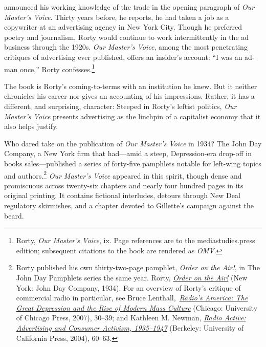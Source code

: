 \documentclass[nohyper,openany,nobib]{tufte-book}
\begin{document}
\vspace{0.5in}

 announced his working knowledge of the trade in the opening
paragraph of \emph{Our Master's Voice}. Thirty years before, he reports,
he had taken a job as a copywriter at an advertising agency in New York
City. Though he preferred poetry and journalism, Rorty would continue to
work intermittently in the ad business through the 1920s. \emph{Our
Master's Voice}, among the most penetrating critiques of advertising
ever published, offers an insider's account: ``I was an ad-man once,''
Rorty confesses.\footnote{Rorty, \emph{Our Master's Voice}, ix. Page references are to the
  mediastudies.press edition; subsequent citations to the book are
  rendered as \emph{OMV}.}

The book is Rorty's coming-to-terms with an institution he knew. But it
neither chronicles his career nor gives an accounting of his
impressions. Rather, it has a different, and surprising, character:
Steeped in Rorty's leftist politics, \emph{Our Master's Voice} presents
advertising as the linchpin of a capitalist economy that it also helps
justify.

Who dared take on the publication of \emph{Our Master's Voice} in 1934?
The John Day Company, a New York firm that had---amid a steep,
Depression-era drop-off in books sales---published a series of
forty-five pamphlets notable for left-wing topics and authors.\footnote{Rorty published his own thirty-two-page pamphlet, \emph{Order on the
  Air!}, in The John Day Pamphlets series the same year. Rorty,
  \emph{\href{https://books.google.com/books/about/Order_on_the_Air.html?id=2vBCAAAAIAAJ}{Order
  on the Air!}} (New York: John Day Company, 1934). For an overview of
  Rorty's critique of commercial radio in particular, see Bruce
  Lenthall,~\emph{\href{http://www.worldcat.org/oclc/84838887}{Radio's
  America: The Great Depression and the Rise of Modern Mass Culture}}
  (Chicago: University of Chicago Press, 2007), 30--39; and Kathleen M.
  Newman, \emph{\href{http://www.worldcat.org/oclc/473847893}{Radio
  Active: Advertising and Consumer Activism, 1935--1947}} (Berkeley:
  University of California Press, 2004), 60--63.}
\emph{Our Master's Voice} appeared in this spirit, though dense and
promiscuous across twenty-six chapters and nearly four hundred pages in
its original printing. It contains fictional interludes, detours through
New Deal regulatory skirmishes, and a chapter devoted to Gillette's
campaign against the beard.
\end{document}
